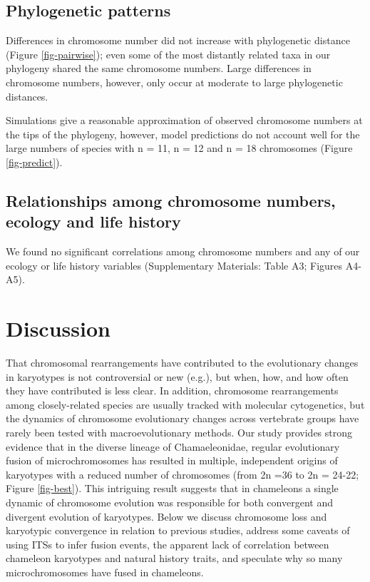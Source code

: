 \documentclass[a4paper, 12pt]{article}
\begin{document}
\subsection{Phylogenetic patterns}
Differences in chromosome number did not increase with phylogenetic distance (Figure \ref{fig-pairwise}); even some of the most distantly related taxa in our phylogeny shared the same chromosome numbers. 
Large differences in chromosome numbers, however, only occur at moderate to large phylogenetic distances. 

Simulations give a reasonable approximation of observed chromosome numbers at the tips of the phylogeny, however, model predictions do not account well for the large numbers of species with n = 11, n = 12 and n = 18 chromosomes (Figure \ref{fig-predict}).

\subsection{Relationships among chromosome numbers, ecology and life history}
We found no significant correlations among chromosome numbers and any of our ecology or life history variables (Supplementary Materials: Table A3; Figures A4-A5). 

\section{Discussion}

That chromosomal rearrangements have contributed to the evolutionary changes in karyotypes is not controversial or new (e.g.\cite{deakin2016anchoring}), but when, how, and how often they have contributed is less clear. 
In addition, chromosome rearrangements among closely-related species are usually tracked with molecular cytogenetics\cite{lisachov2021whole}, but the dynamics of chromosome evolutionary changes across vertebrate groups have rarely been tested with macroevolutionary methods. 
Our study provides strong evidence that in the diverse lineage of Chamaeleonidae, regular evolutionary fusion of microchromosomes has resulted in multiple, independent origins of karyotypes with a reduced number of chromosomes (from 2n =36 to 2n = 24-22; Figure \ref{fig-best}). 
This intriguing result suggests that in chameleons a single dynamic of chromosome evolution was responsible for both convergent and divergent evolution of karyotypes. 
Below we discuss chromosome loss and karyotypic convergence in relation to previous studies, address some caveats of using ITSs to infer fusion events, the apparent lack of correlation between chameleon karyotypes and natural history traits, and speculate why so many microchromosomes have fused in chameleons.    
\end{document}

